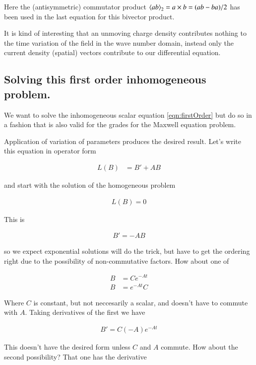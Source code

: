 \documentclass{article}
\begin{document}
Here the (antisymmetric) commutator product ${\left\langle{{ab}}\right\rangle}_{2} = a \times b = (a b - ba)/2$ has been used in the last equation for this bivector product.

It is kind of interesting that an unmoving charge density contributes nothing
to the time variation of the field in the wave number domain, instead
only the current density (spatial) vectors contribute to our differential
equation.

\subsection{ Solving this first order inhomogeneous problem. } 

We want to solve the inhomogeneous scalar equation 
\ref{eqn:firstOrder} but do so in a fashion that is also valid for
the grades for the Maxwell equation problem.

Application of variation of parameters produces the desired result.  Let's write this equation in operator form

\begin{align*}
L(B) &= B' + A B
\end{align*}

and start with the solution of the 
homogeneous problem

\begin{align*}
L(B) = 0
\end{align*}

This is 

\begin{align*}
B' = -A B
\end{align*}

so we expect exponential solutions will do the trick, but have to get the ordering right due to the possibility of non-commutative factors.  How about one of

\begin{align*}
B &= C e^{-At} \\
B &= e^{-At} C
\end{align*}

Where $C$ is constant, but not neccesarily a scalar, and doesn't have to commute with $A$.  Taking derivatives of the first we have

\begin{align*}
B' = C (-A) e^{-At}
\end{align*}

This doesn't have the desired form unless $C$ and $A$ commute.  How about the second possibility?  That one has the derivative
\end{document}
